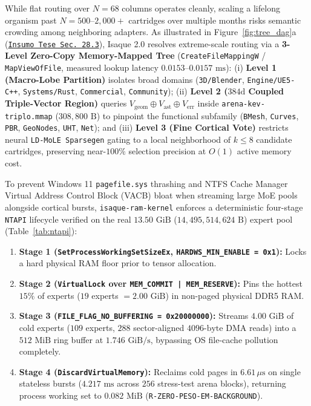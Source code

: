 \documentclass[10pt,a4paper]{article}
\begin{document}
While flat routing over $N=68$ columns operates cleanly, scaling a lifelong organism past $N = 500\text{--}2,000+$ cartridges over multiple months risks semantic crowding among neighboring adapters. As illustrated in Figure~\ref{fig:tree_dag}a (\href{https://drive.google.com/file/d/1-i60d5UqJBOJQYLSr-ErZxecFeYSi4zX/view?usp=drivesdk}{\texttt{Insumo Tese Sec.\ 28.3}}), Isaque 2.0 resolves extreme-scale routing via a \textbf{3-Level Zero-Copy Memory-Mapped Tree} (\texttt{CreateFileMappingW} / \texttt{MapViewOfFile}, measured lookup latency \textbf{$0.0153\text{--}0.0157\text{ ms}$}): (i) \textbf{Level 1 (Macro-Lobe Partition)} isolates broad domains (\texttt{3D/Blender}, \texttt{Engine/UE5-C++}, \texttt{Systems/Rust}, \texttt{Commercial}, \texttt{Community}); (ii) \textbf{Level 2 ($384\text{d}$ Coupled Triple-Vector Region)} queries $V_{\text{geom}} \oplus V_{\text{ast}} \oplus V_{\text{err}}$ inside \texttt{arena-kev-triplo.mmap} ($308,800\text{ B}$) to pinpoint the functional subfamily (\texttt{BMesh}, \texttt{Curves}, \texttt{PBR}, \texttt{GeoNodes}, \texttt{UHT}, \texttt{Net}); and (iii) \textbf{Level 3 (Fine Cortical Vote)} restricts neural \texttt{LD-MoLE Sparsegen} gating to a local neighborhood of $k \le 8$ candidate cartridges, preserving near-$100\%$ selection precision at $O(1)$ active memory cost.

To prevent Windows 11 \texttt{pagefile.sys} thrashing and NTFS Cache Manager Virtual Address Control Block (VACB) bloat when streaming large MoE pools alongside cortical bursts, \texttt{isaque-ram-kernel} enforces a deterministic four-stage \texttt{NTAPI} lifecycle verified on the real $13.50\text{ GiB}$ ($14,495,514,624\text{ B}$) expert pool (Table~\ref{tab:ntapi}):
\begin{enumerate}
  \item \textbf{Stage 1 (\texttt{SetProcessWorkingSetSizeEx}, \texttt{HARDWS\_\allowbreak{}MIN\_\allowbreak{}ENABLE = 0x1}):} Locks a hard physical RAM floor prior to tensor allocation.
  \item \textbf{Stage 2 (\texttt{VirtualLock} over \texttt{MEM\_\allowbreak{}COMMIT | MEM\_\allowbreak{}RESERVE}):} Pins the hottest $15\%$ of experts ($19$ experts $= 2.00\text{ GiB}$) in non-paged physical DDR5 RAM.
  \item \textbf{Stage 3 (\texttt{FILE\_\allowbreak{}FLAG\_\allowbreak{}NO\_\allowbreak{}BUFFERING = 0x20000000}):} Streams $4.00\text{ GiB}$ of cold experts ($109$ experts, $288$ sector-aligned $4096\text{-byte}$ DMA reads) into a $512\text{ MiB}$ ring buffer at \textbf{$1.746\text{ GiB/s}$}, bypassing OS file-cache pollution completely.
  \item \textbf{Stage 4 (\texttt{DiscardVirtualMemory}):} Reclaims cold pages in \textbf{$6.61\,\mu\text{s}$} on single stateless bursts ($4.217\text{ ms}$ across $256$ stress-test arena blocks), returning process working set to $0.082\text{ MiB}$ (\texttt{R-ZERO-PESO-EM-BACKGROUND}).
\end{enumerate}
\end{document}

